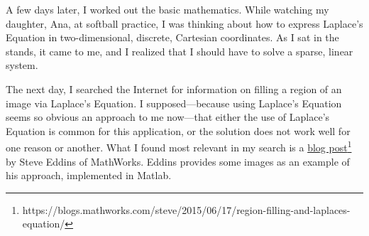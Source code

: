 \documentclass{article}
\begin{document}
A few days later, I worked out the basic mathematics.  While watching my
daughter, Ana, at softball practice, I was thinking about how to express
Laplace's Equation in two-dimensional, discrete, Cartesian coordinates.  As I
sat in the stands, it came to me, and I realized that I should have to solve a
sparse, linear system.

\newcommand{\mathworksurl}{https://blogs.mathworks.com/steve/2015/06/17/region-filling-and-laplaces-equation/}

The next day, I searched the Internet for information on filling a region of an
image via Laplace's Equation.  I supposed---because using Laplace's Equation
seems so obvious an approach to me now---that either the use of Laplace's
Equation is common for this application, or the solution does not work well for
one reason or another.  What I found most relevant in my search is a
\href{\mathworksurl}{blog post}\footnote{\mathworksurl} by Steve Eddins of
MathWorks.  Eddins provides some images as an example of his approach,
implemented in Matlab.
\end{document}
